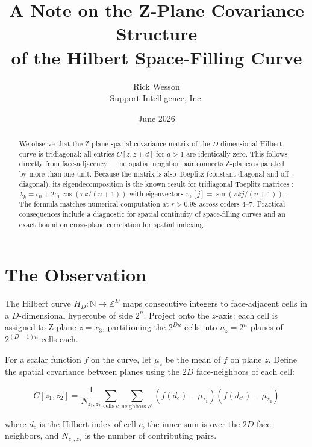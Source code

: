 \documentclass[11pt,a4paper]{article}
\title{A Note on the Z-Plane Covariance Structure\\
of the Hilbert Space-Filling Curve}
\author{Rick Wesson\\
Support Intelligence, Inc.}
\date{June 2026}
\begin{document}
\maketitle

\begin{abstract}
We observe that the Z-plane spatial covariance matrix of the
$D$-dimensional Hilbert curve is tridiagonal: all entries $C[z, z \pm d]$
for $d > 1$ are identically zero. This follows directly from
face-adjacency --- no spatial neighbor pair connects Z-planes separated by
more than one unit. Because the matrix is also Toeplitz (constant diagonal
and off-diagonal), its eigendecomposition is the known result for
tridiagonal Toeplitz matrices \cite{grenander1958}: $\lambda_k = c_0 +
2c_1\cos(\pi k/(n+1))$ with eigenvectors $v_k[j] = \sin(\pi k j/(n+1))$.
The formula matches numerical computation at $r > 0.98$ across orders
4--7. Practical consequences include a diagnostic for spatial continuity
of space-filling curves and an exact bound on cross-plane correlation for
spatial indexing.
\end{abstract}

\section{The Observation}

The Hilbert curve $H_D: \mathbb{N} \to \mathbb{Z}^D$ \cite{hilbert1891}
maps consecutive integers to face-adjacent cells in a $D$-dimensional
hypercube of side $2^n$. Project onto the $z$-axis: each cell is assigned
to Z-plane $z = x_3$, partitioning the $2^{Dn}$ cells into $n_z = 2^n$
planes of $2^{(D-1)n}$ cells each.

For a scalar function $f$ on the curve, let $\mu_z$ be the mean of $f$ on
plane $z$. Define the spatial covariance between planes using the $2D$
face-neighbors of each cell:

\begin{equation}
C[z_1, z_2] = \frac{1}{N_{z_1,z_2}} \sum_{\text{cells } c}
\sum_{\text{neighbors } c'} (f(d_c) - \mu_{z_1})(f(d_{c'}) - \mu_{z_2})
\label{eq:cov}
\end{equation}

where $d_c$ is the Hilbert index of cell $c$, the inner sum is over the
$2D$ face-neighbors, and $N_{z_1,z_2}$ is the number of contributing pairs.
\end{document}
